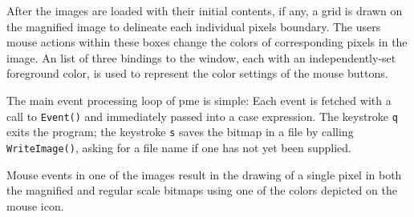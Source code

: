 
After the images are loaded with their initial contents, if any, a grid
is drawn on the magnified image to delineate each individual
pixel{\textquotesingle}s boundary. The user{\textquotesingle}s mouse
actions within these boxes change the colors of corresponding pixels in
the image. An list of three bindings to the window, each with an
independently-set foreground color, is used to represent the color
settings of the mouse buttons.


The main event processing loop of pme is simple: Each event is fetched
with a call to \texttt{Event()} and immediately passed into a case
expression. The keystroke \texttt{{\textquotedbl}q{\textquotedbl}}
exits the program; the keystroke
\texttt{{\textquotedbl}s{\textquotedbl}} saves the bitmap in a file by
calling \texttt{WriteImage()}, asking for a file name if one has not
yet been supplied.


Mouse events in one of the images result in the drawing of a single
pixel in both the magnified and regular scale bitmaps using one of the
colors depicted on the mouse icon. 

